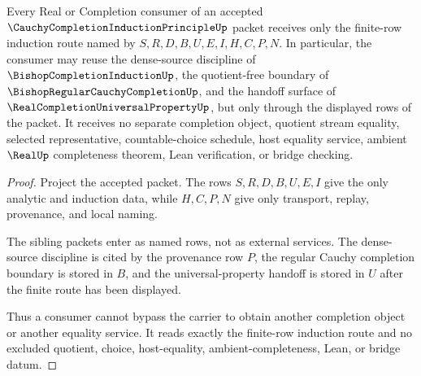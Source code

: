 \begin{theorem}
\label{thm:cauchy-completion-induction-principle-consumer-boundary}
Every Real or Completion consumer of an accepted $\CauchyCompletionInductionPrincipleUp$ packet receives only the finite-row induction route named by $S,R,D,B,U,E,I,H,C,P,N$. In particular, the consumer may reuse the dense-source discipline of $\BishopCompletionInductionUp$, the quotient-free boundary of $\BishopRegularCauchyCompletionUp$, and the handoff surface of $\RealCompletionUniversalPropertyUp$, but only through the displayed rows of the packet. It receives no separate completion object, quotient stream equality, selected representative, countable-choice schedule, host equality service, ambient $\RealUp$ completeness theorem, Lean verification, or bridge checking.
\end{theorem}
\begin{proof}
Project the accepted packet. The rows $S,R,D,B,U,E,I$ give the only analytic and induction data, while $H,C,P,N$ give only transport, replay, provenance, and local naming.

The sibling packets enter as named rows, not as external services. The dense-source discipline is cited by the provenance row $P$, the regular Cauchy completion boundary is stored in $B$, and the universal-property handoff is stored in $U$ after the finite route has been displayed.

Thus a consumer cannot bypass the carrier to obtain another completion object or another equality service. It reads exactly the finite-row induction route and no excluded quotient, choice, host-equality, ambient-completeness, Lean, or bridge datum.
\end{proof}



